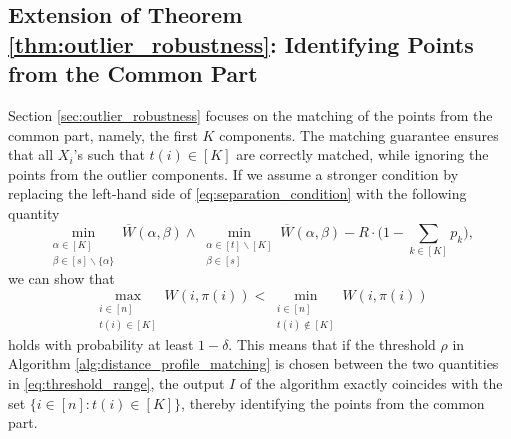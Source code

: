 \documentclass[11pt,letterpaper]{article}
\theoremstyle{definition}
\numberwithin{equation}{section}
\begin{document}
\subsection{Extension of Theorem \ref{thm:outlier_robustness}: Identifying Points from the Common Part}
\label{sec:inliers}
Section \ref{sec:outlier_robustness} focuses on the matching of the points from the common part, namely, the first $K$ components. The matching guarantee ensures that all $X_i$'s such that $t(i) \in [K]$ are correctly matched, while ignoring the points from the outlier components. If we assume a stronger condition by replacing the left-hand side of \eqref{eq:separation_condition} with the following quantity
\begin{equation}
    \label{eq:mixture_centers_separation_stronger}
    \min_{\substack{\alpha \in [K] \\ \beta \in [s] \backslash \{\alpha\}}} \overline{W}(\alpha, \beta) \wedge \min_{\substack{\alpha \in [t] \backslash [K] \\ \beta \in [s]}} \overline{W}(\alpha, \beta) - R \cdot \bigg(1 - \sum_{k \in [K]} p_k \bigg),
\end{equation}
we can show that
\begin{equation}
    \label{eq:threshold_range}
    \max_{\substack{i \in [n] \\ t(i) \in [K]}} W(i, \pi(i)) < \min_{\substack{i \in [n] \\ t(i) \notin [K]}} W(i, \pi(i))
\end{equation}
holds with probability at least $1 - \delta$. This means that if the threshold $\rho$ in Algorithm \ref{alg:distance_profile_matching} is chosen between the two quantities in \eqref{eq:threshold_range}, the output $I$ of the algorithm exactly coincides with the set $\{i \in [n] : t(i) \in [K]\}$, thereby identifying the points from the common part. 
\end{document}
